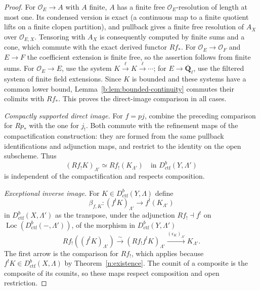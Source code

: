\documentclass[11pt,a4paper]{article}
\numberwithin{equation}{section}
\theoremstyle{definition}
\theoremstyle{remark}
\newcommand{\Loc}{\operatorname{Loc}}
\newcommand{\Qbar}{\overline{\mathbf Q}_\ell}
\newcommand{\Dctf}{D^b_{\mathrm{ctf}}}
\begin{document}
\begin{proof}
For $\mathcal O_E\to A$ with $A$ finite, $A$ has a finite free
$\mathcal O_E$-resolution of length at most one. Its condensed
version is exact (a continuous map to a finite quotient lifts on a
finite clopen partition), and pullback gives a finite free resolution
of $A_X$ over $\mathcal O_{E,X}$. Tensoring with $A_X$ is consequently
computed by finite sums and a cone, which commute with the exact
derived functor $Rf_*$. For $\mathcal O_E\to\mathcal O_F$ and
$E\to F$ the coefficient extension is finite free, so the assertion
follows from finite sums. For $\mathcal O_E\to E$, use the system
$K\xrightarrow{\ell}K\xrightarrow{\ell}\cdots$; for $E\to\Qbar$,
use the filtered system of finite field extensions. Since $K$ is
bounded and these systems have a common lower bound,
Lemma~\ref{b:lem:bounded-continuity} commutes their colimits with
$Rf_*$. This proves the direct-image comparison in all cases.

\emph{Compactly supported direct image.}
For $f=pj$, combine the preceding comparison for $Rp_*$ with the
one for $j_!$. Both commute with the refinement maps of the
compactification construction: they are formed from the same
pullback identifications and adjunction maps, and restrict to the
identity on the open subscheme. Thus
\[
 (Rf_!K)_{\Lambda'}\simeq Rf_!(K_{\Lambda'})
 \quad\text{in }\Dctf(Y,\Lambda')
\]
is independent of the compactification and respects composition.

\emph{Exceptional inverse image.}
For $K\in\Dctf(Y,\Lambda)$ define
\[
 \beta_{f,K}:(f^!K)_{\Lambda'}\longrightarrow f^!(K_{\Lambda'})
\]
in $\Dctf(X,\Lambda')$ as the transpose, under the adjunction
$Rf_!\dashv f^!$ on $\Loc(\Dctf(-,\Lambda'))$, of the morphism in
$\Dctf(Y,\Lambda')$
\[
 Rf_!((f^!K)_{\Lambda'})
 \xrightarrow{\sim}(Rf_!f^!K)_{\Lambda'}
 \xrightarrow{(\epsilon_K)_{\Lambda'}}K_{\Lambda'}.
\]
The first arrow is the comparison for $Rf_!$, which applies because
$f^!K\in\Dctf(X,\Lambda)$ by Theorem~\ref{n:existence}. The counit of a composite
is the composite of its counits, so these maps respect composition
and open restriction.


\end{proof}
\end{document}
